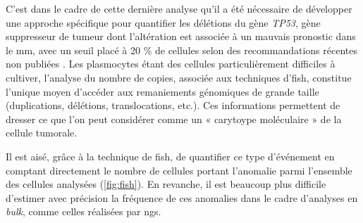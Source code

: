 C'est dans le cadre de cette dernière analyse qu'il a été nécessaire de développer une approche spécifique pour quantifier les délétions du gène \textit{TP53}, 
gène suppresseur de tumeur dont l'altération est associée à un mauvais pronostic dans le \gls{mm}, avec un seuil placé à 20 \% de cellules selon des recommandations 
récentes non publiées \cite{flyntPrognosisBiologyTargeting2020}.
Les plasmocytes étant des cellules particulièrement difficiles à cultiver, l'analyse du nombre de copies, associée aux techniques d'\gls{fish}, constitue l'unique 
moyen d'accéder aux remaniements génomiques de grande taille (duplications, délétions, translocations, etc.).
Ces informations permettent de dresser ce que l'on peut considérer comme un « carytoype moléculaire » de la cellule tumorale. 

\vspace{1em}

Il est aisé, grâce à la technique de \gls{fish}, de quantifier ce type d'événement en comptant directement le nombre de cellules portant l'anomalie parmi l'ensemble des cellules analysées 
(\autoref{fig:fish}).  
En revanche, il est beaucoup plus difficile d'estimer avec précision la fréquence de ces anomalies dans le cadre d'analyses en \textit{bulk}, comme celles réalisées par \gls{ngs}.

